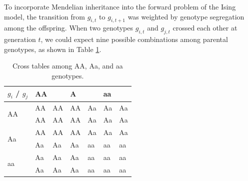 \documentclass[12pt,]{article}
\begin{document}
To incorporate Mendelian inheritance into the forward problem of the Ising model, the transition from $g_{i,t}$ to $g_{i,t+1}$ was weighted by genotype segregation among the offspring. When two genotypes $g_{i,t}$ and $g_{j,t}$ crossed each other at generation $t$, we could expect nine possible combinations among parental genotypes, as shown in Table \ref{tableS1:MCMCinherit}.

\begin{table}
\centering
\caption{Cross tables among AA, Aa, and aa genotypes.}
\begin{tabular}{|l|ll|ll|ll|}
\hline
$g_i$ / $g_j$             & \multicolumn{2}{l|}{AA} & \multicolumn{2}{l|}{ A } & \multicolumn{2}{l|}{aa} \\ \hline
\multirow{2}{*}{AA} & AA         & AA         & AA         & Aa         & Aa         & Aa         \\
                    & AA         & AA         & AA         & Aa         & Aa         & Aa         \\ \hline
\multirow{2}{*}{Aa} & AA         & AA         & AA         & Aa         & Aa         & Aa         \\
                    & Aa         & Aa         & Aa         & aa         & aa         & aa         \\ \hline
\multirow{2}{*}{aa} & Aa         & Aa         & Aa         & aa         & aa         & aa         \\
                    & Aa         & Aa         & Aa         & aa         & aa         & aa         \\ \hline
\end{tabular}
  \label{tableS1:MCMCinherit}
\end{table}
\end{document}
